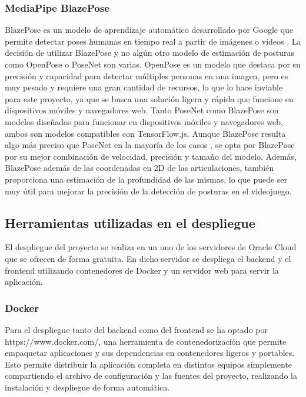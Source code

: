 \subsubsection{MediaPipe BlazePose}
\label{c08:subsubsec:mediapipe}
BlazePose es un modelo de aprendizaje automático desarrollado por Google que
permite detectar poses humanas en tiempo real a partir de imágenes o vídeos
\parencite{bazarevsky2020blazepose} \parencite{xu2020ghum}. La decisión de
utilizar BlazePose y no algún otro modelo de estimación de posturas como
OpenPose o PoseNet son varias. OpenPose es un modelo que destaca por su
precisión y capacidad para detectar múltiples personas en una imagen, pero es
muy pesado y requiere una gran cantidad de recursos, lo que lo hace inviable
para este proyecto, ya que se busca una solución ligera y rápida que funcione en
dispositivos móviles y navegadores web. Tanto PoseNet como BlazePose son modelos
diseñados para funcionar en dispositivos móviles y navegadores web, ambos son
modelos compatibles con TensorFlow.js. Aunque BlazePose resulta algo más preciso
que PoseNet en la mayoría de los casos \parencite{MediaPipeMirror}, se opta por
BlazePose por su mejor combinación de velocidad, precisión y tamaño del modelo.
Además, BlazePose además de las coordenadas en 2D de las articulaciones, también
proporciona una estimación de la profundidad de las mismas, lo que puede ser muy
útil para mejorar la precisión de la detección de posturas en el videojuego.

\subsection{Herramientas utilizadas en el despliegue}
\label{c08:subsec:herramientas-despliegue}
El despliegue del proyecto se realiza en un uno de los servidores de Oracle
Cloud que se ofrecen de forma gratuita. En dicho servidor se despliega el
\gls{backend} y el \gls{frontend} utilizando contenedores de Docker y un
servidor web para servir la aplicación.

\subsubsection{Docker}
\label{c08:subsubsec:docker}
Para el despliegue tanto del \gls{backend} como del \gls{frontend} se ha optado
por  {https://www.docker.com/}, una herramienta de
contenedorización que permite empaquetar aplicaciones y sus dependencias en
contenedores ligeros y portables. Esto permite distribuir la aplicación completa
en distintos equipos simplemente compartiendo el archivo de configuración y las
fuentes del proyecto, realizando la instalación y despliegue de forma
automática.

